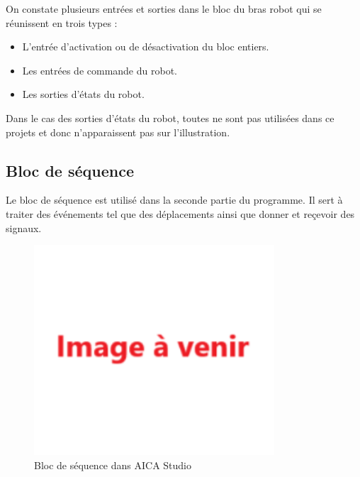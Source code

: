 On constate plusieurs entrées et sorties dans le bloc du bras robot qui se réunissent en trois types :
\begin{itemize}
    \item L'entrée d'activation ou de désactivation du bloc entiers.
    \item Les entrées de commande du robot.
    \item Les sorties d'états du robot.
\end{itemize}


Dans le cas des sorties d'états du robot, toutes ne sont pas utilisées dans ce projets et donc n'apparaissent pas sur l'illustration.

\subsection{Bloc de séquence}

Le bloc de séquence est utilisé dans la seconde partie du programme. Il sert à traiter des événements tel que des déplacements ainsi que donner et reçevoir des signaux.

\begin{figure}[H]
    \centering
    \includegraphics[width=0.8\textwidth]{assets/figures/img_a_venir.png}
    \caption{Bloc de séquence dans AICA Studio}
    \label{fig:sequence_block}
\end{figure}

